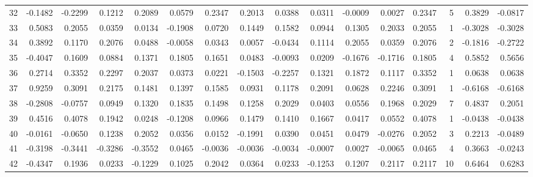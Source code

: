 \begin{tabular}{lrrrrrrrrrrrrrrr}
32  &     -0.1482 & -0.2299 &  0.1212 &  0.2089 &  0.0579 &  0.2347 &  0.2013 &  0.0388 &  0.0311 & -0.0009 &   0.0027 &     0.2347 &      5 &                    0.3829 &                    -0.0817 \\
33  &      0.5083 &  0.2055 &  0.0359 &  0.0134 & -0.1908 &  0.0720 &  0.1449 &  0.1582 &  0.0944 &  0.1305 &   0.2033 &     0.2055 &      1 &                   -0.3028 &                    -0.3028 \\
34  &      0.3892 &  0.1170 &  0.2076 &  0.0488 & -0.0058 &  0.0343 &  0.0057 & -0.0434 &  0.1114 &  0.2055 &   0.0359 &     0.2076 &      2 &                   -0.1816 &                    -0.2722 \\
35  &     -0.4047 &  0.1609 &  0.0884 &  0.1371 &  0.1805 &  0.1651 &  0.0483 & -0.0093 &  0.0209 & -0.1676 &  -0.1716 &     0.1805 &      4 &                    0.5852 &                     0.5656 \\
36  &      0.2714 &  0.3352 &  0.2297 &  0.2037 &  0.0373 &  0.0221 & -0.1503 & -0.2257 &  0.1321 &  0.1872 &   0.1117 &     0.3352 &      1 &                    0.0638 &                     0.0638 \\
37  &      0.9259 &  0.3091 &  0.2175 &  0.1481 &  0.1397 &  0.1585 &  0.0931 &  0.1178 &  0.2091 &  0.0628 &   0.2246 &     0.3091 &      1 &                   -0.6168 &                    -0.6168 \\
38  &     -0.2808 & -0.0757 &  0.0949 &  0.1320 &  0.1835 &  0.1498 &  0.1258 &  0.2029 &  0.0403 &  0.0556 &   0.1968 &     0.2029 &      7 &                    0.4837 &                     0.2051 \\
39  &      0.4516 &  0.4078 &  0.1942 &  0.0248 & -0.1208 &  0.0966 &  0.1479 &  0.1410 &  0.1667 &  0.0417 &   0.0552 &     0.4078 &      1 &                   -0.0438 &                    -0.0438 \\
40  &     -0.0161 & -0.0650 &  0.1238 &  0.2052 &  0.0356 &  0.0152 & -0.1991 &  0.0390 &  0.0451 &  0.0479 &  -0.0276 &     0.2052 &      3 &                    0.2213 &                    -0.0489 \\
41  &     -0.3198 & -0.3441 & -0.3286 & -0.3552 &  0.0465 & -0.0036 & -0.0036 & -0.0034 & -0.0007 &  0.0027 &  -0.0065 &     0.0465 &      4 &                    0.3663 &                    -0.0243 \\
42  &     -0.4347 &  0.1936 &  0.0233 & -0.1229 &  0.1025 &  0.2042 &  0.0364 &  0.0233 & -0.1253 &  0.1207 &   0.2117 &     0.2117 &     10 &                    0.6464 &                     0.6283 \\

\end{tabular}
